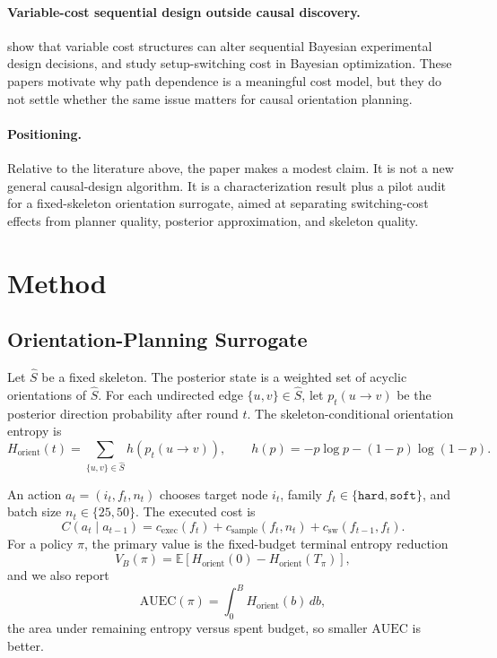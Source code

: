 \documentclass[10pt]{article}
\newcommand{\Horient}{H_{\mathrm{orient}}}
\newcommand{\VB}{V_B}
\newcommand{\AUEC}{\mathrm{AUEC}}
\begin{document}
\paragraph{Variable-cost sequential design outside causal discovery.}
\citet{zheng2020sequential} show that variable cost structures can alter sequential Bayesian experimental design decisions, and \citet{pricopie2024setup} study setup-switching cost in Bayesian optimization. These papers motivate why path dependence is a meaningful cost model, but they do not settle whether the same issue matters for causal orientation planning.

\paragraph{Positioning.}
Relative to the literature above, the paper makes a modest claim. It is not a new general causal-design algorithm. It is a characterization result plus a pilot audit for a fixed-skeleton orientation surrogate, aimed at separating switching-cost effects from planner quality, posterior approximation, and skeleton quality.

\section{Method}
\label{sec:method}

\subsection{Orientation-Planning Surrogate}
Let $\hat{S}$ be a fixed skeleton. The posterior state is a weighted set of acyclic orientations of $\hat{S}$. For each undirected edge $\{u,v\}\in\hat{S}$, let $p_t(u\rightarrow v)$ be the posterior direction probability after round $t$. The skeleton-conditional orientation entropy is
\begin{equation}
\Horient(t)=\sum_{\{u,v\}\in\hat{S}} h\!\left(p_t(u\rightarrow v)\right),
\qquad
h(p)=-p\log p-(1-p)\log(1-p).
\end{equation}

An action $a_t=(i_t,f_t,n_t)$ chooses target node $i_t$, family $f_t\in\{\texttt{hard},\texttt{soft}\}$, and batch size $n_t\in\{25,50\}$. The executed cost is
\begin{equation}
C(a_t \mid a_{t-1})=
c_{\mathrm{exec}}(f_t)+c_{\mathrm{sample}}(f_t,n_t)+c_{\mathrm{sw}}(f_{t-1},f_t).
\end{equation}
For a policy $\pi$, the primary value is the fixed-budget terminal entropy reduction
\begin{equation}
\VB(\pi)=\mathbb{E}\!\left[\Horient(0)-\Horient(T_\pi)\right],
\end{equation}
and we also report
\begin{equation}
\AUEC(\pi)=\int_0^B \Horient(b)\,db,
\end{equation}
the area under remaining entropy versus spent budget, so smaller $\AUEC$ is better.
\end{document}
